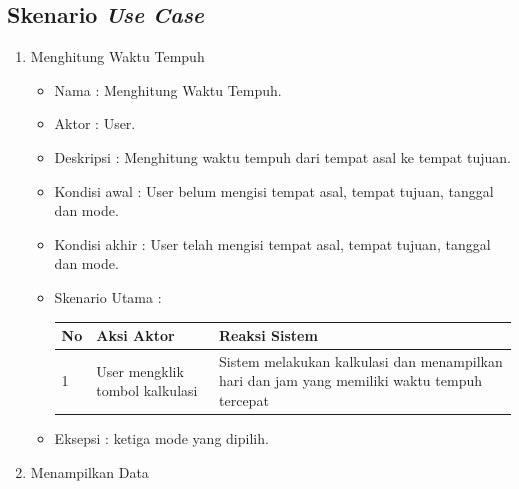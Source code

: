 \subsection{Skenario \textit{Use Case}}
\label{subsec:skenariousecase}

\begin{enumerate}
	\item Menghitung Waktu Tempuh
	
	\begin{itemize}
		\item Nama : Menghitung Waktu Tempuh.
		\item Aktor : User.
		\item Deskripsi : Menghitung waktu tempuh dari tempat asal ke tempat tujuan.
		\item Kondisi awal : User belum mengisi tempat asal, tempat tujuan, tanggal dan mode. 
		\item Kondisi akhir : User telah mengisi tempat asal, tempat tujuan, tanggal dan mode. 
		\item Skenario Utama : \\
		\begin{table}[H]
\centering
\begin{tabular}{|p{1cm}|p{4cm}|p{4cm}|}
\hline
No & Aksi Aktor                     & Reaksi Sistem                                                                               \\ \hline
1  & User mengklik tombol kalkulasi & Sistem melakukan kalkulasi dan menampilkan hari dan jam yang memiliki waktu tempuh tercepat \\ \hline
\end{tabular}
\end{table}
		\item Eksepsi : ketiga mode yang dipilih.
	\end{itemize}
	
	\item Menampilkan Data
	

\end{enumerate}

